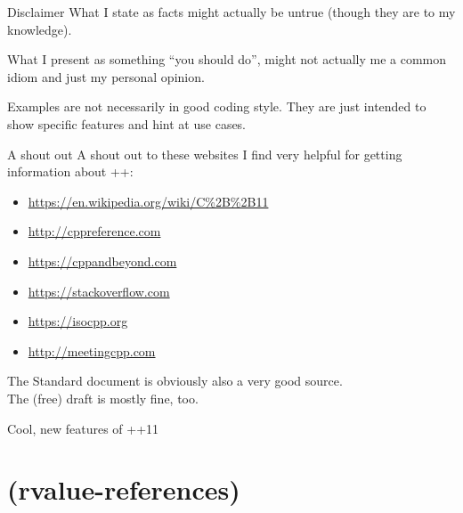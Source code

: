 	\begin{frame}{Disclaimer}
		What I state as facts might actually be untrue (though they are to my knowledge).
		
		\emptyline
		
		What I present as something ``you should do'', might not actually me a common idiom
		and just my personal opinion.
		
		\pause
		
		\emptyline
		Examples are not necessarily in good coding style. They are just intended to show specific features and hint at use cases.
		
	\end{frame}
	
	\begin{frame}{A shout out}
		A shout out to these websites I find very helpful for getting information about \C++:
		\begin{itemize}
			\item \url{https://en.wikipedia.org/wiki/C\%2B\%2B11}
			\item \url{http://cppreference.com}
			\item \url{https://cppandbeyond.com}
			\item \url{https://stackoverflow.com}
			\item \url{https://isocpp.org}
			\item \url{http://meetingcpp.com}
		\end{itemize}
		
		\pause
		
		\emptyline
		The Standard document is obviously also a very good source. \\
		The (free) draft is mostly fine, too.
	\end{frame}
	
	\begin{frame}{Cool, new features of \C++11}
		\begin{small}
			\tableofcontents
		\end{small}
	\end{frame}
	
	\section{(rvalue-references)}
